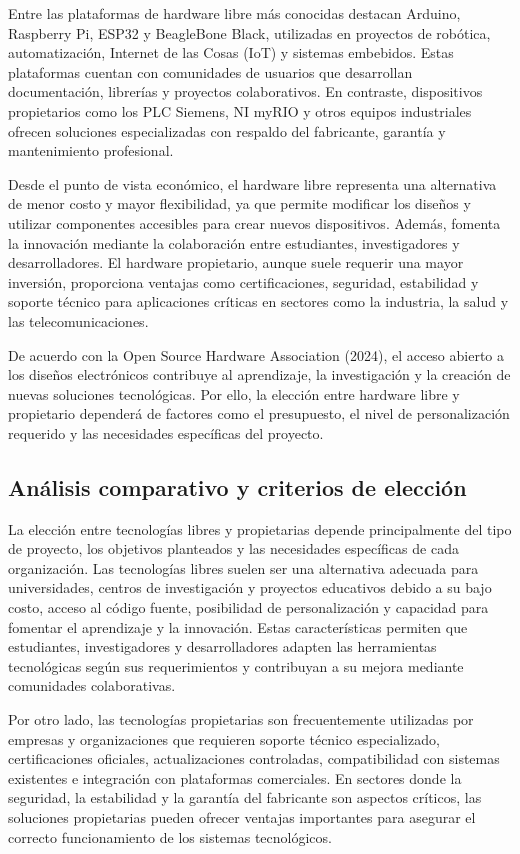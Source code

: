 \documentclass[12pt]{article}
\begin{document}
	Entre las plataformas de hardware libre más conocidas destacan Arduino, Raspberry Pi, ESP32 y BeagleBone Black, utilizadas en proyectos de robótica, automatización, Internet de las Cosas (IoT) y sistemas embebidos. Estas plataformas cuentan con comunidades de usuarios que desarrollan documentación, librerías y proyectos colaborativos. En contraste, dispositivos propietarios como los PLC Siemens, NI myRIO y otros equipos industriales ofrecen soluciones especializadas con respaldo del fabricante, garantía y mantenimiento profesional.
	
	Desde el punto de vista económico, el hardware libre representa una alternativa de menor costo y mayor flexibilidad, ya que permite modificar los diseños y utilizar componentes accesibles para crear nuevos dispositivos. Además, fomenta la innovación mediante la colaboración entre estudiantes, investigadores y desarrolladores. El hardware propietario, aunque suele requerir una mayor inversión, proporciona ventajas como certificaciones, seguridad, estabilidad y soporte técnico para aplicaciones críticas en sectores como la industria, la salud y las telecomunicaciones.
	
	De acuerdo con la Open Source Hardware Association (2024), el acceso abierto a los diseños electrónicos contribuye al aprendizaje, la investigación y la creación de nuevas soluciones tecnológicas. Por ello, la elección entre hardware libre y propietario dependerá de factores como el presupuesto, el nivel de personalización requerido y las necesidades específicas del proyecto.

	\subsection{Análisis comparativo y criterios de elección}
	
	La elección entre tecnologías libres y propietarias depende principalmente del tipo de proyecto, los objetivos planteados y las necesidades específicas de cada organización. Las tecnologías libres suelen ser una alternativa adecuada para universidades, centros de investigación y proyectos educativos debido a su bajo costo, acceso al código fuente, posibilidad de personalización y capacidad para fomentar el aprendizaje y la innovación. Estas características permiten que estudiantes, investigadores y desarrolladores adapten las herramientas tecnológicas según sus requerimientos y contribuyan a su mejora mediante comunidades colaborativas.
	
	Por otro lado, las tecnologías propietarias son frecuentemente utilizadas por empresas y organizaciones que requieren soporte técnico especializado, certificaciones oficiales, actualizaciones controladas, compatibilidad con sistemas existentes e integración con plataformas comerciales. En sectores donde la seguridad, la estabilidad y la garantía del fabricante son aspectos críticos, las soluciones propietarias pueden ofrecer ventajas importantes para asegurar el correcto funcionamiento de los sistemas tecnológicos.
	
\end{document}
